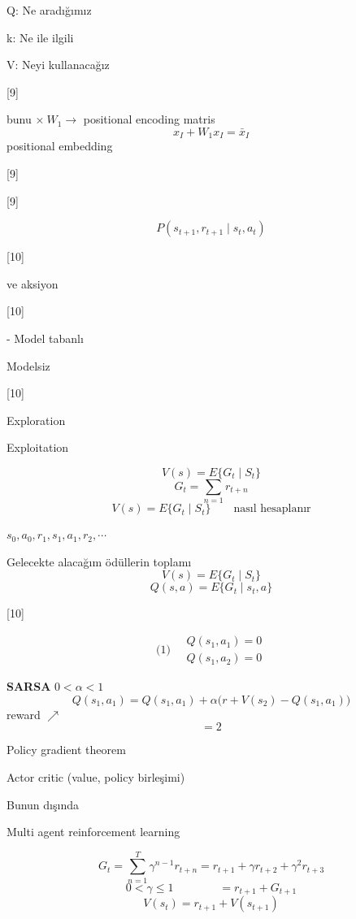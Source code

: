 \documentclass[11pt,a4paper]{article}
\begin{document}
Q: Ne aradığımız

k: Ne ile ilgili

V: Neyi kullanacağız

[9]

bunu $\times\ W_1 \to$ positional encoding matris
\[ x_I + W_1 x_I = \bar{x}_I \]
positional embedding

[9]

[9]

\[ P(s_{t+1}, r_{t+1} \mid s_t, a_t) \]

[10]

ve aksiyon 

[10]

- Model tabanlı

Modelsiz

[10]

Exploration

Exploitation


\[ V(s)=E\{G_t\mid S_t\} \]
\[ G_t=\sum_{n=1} r_{t+n} \]
\[ V(s)=E\{G_t\mid S_t\} \qquad \text{nasıl hesaplanır} \]

$s_0, a_0, r_1, s_1, a_1, r_2, \cdots$

Gelecekte alacağım ödüllerin toplamı
\[ V(s)=E\{G_t\mid S_t\} \]
\[ Q(s,a)=E\{G_t\mid s_t,a\} \]

[10]

\[ \text{(1)}\quad \boxed{\begin{array}{l}Q(s_1,a_1)=0\\Q(s_1,a_2)=0\end{array}} \]

\textbf{SARSA} \quad $0<\alpha<1$
\[ Q(s_1,a_1)=Q(s_1,a_1)+\alpha\bigl(r+V(s_2)-Q(s_1,a_1)\bigr) \]
reward \quad $\nearrow$ 
\[ =2 \]

Policy gradient theorem

Actor critic (value, policy birleşimi)

Bunun dışında

Multi agent reinforcement learning

\[ G_t=\sum_{n=1}^{T}\gamma^{n-1}r_{t+n}=r_{t+1}+\gamma r_{t+2}+\gamma^{2}r_{t+3} \]
\[ 0<\gamma\le 1 \qquad\qquad =r_{t+1}+G_{t+1} \]
\[ V(s_t)=r_{t+1}+V(s_{t+1}) \]
\end{document}

